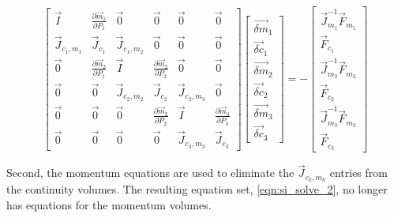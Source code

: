   \begin{equation}
 \label{eqn:si_solve_1}
 \begin{bmatrix} 
 \vec{I} & \frac{\partial \vec{m}_1}{\partial P_1} & \vec{0} & \vec{0} & \vec{0} & \vec{0}\\
 \vec{J}_{c_1,m_1} & \vec{J}_{c_1} & \vec{J}_{c_1,m_2} & \vec{0} & \vec{0} & \vec{0} \\
 \vec{0} & \frac{\partial \vec{m}_2}{\partial P_1} & \vec{I} & \frac{\partial \vec{m}_2}{\partial P_2} & \vec{0} & \vec{0} \\
 \vec{0} & \vec{0} & \vec{J}_{c_2,m_2} & \vec{J}_{c_2} & \vec{J}_{c_2,m_3} & \vec{0} \\
 \vec{0} & \vec{0} & \vec{0} & \frac{\partial \vec{m}_{3}}{\partial P_2} & \vec{I} & \frac{\partial \vec{m}_{3}}{\partial P_3} \\ 
 \vec{0} & \vec{0} & \vec{0} & \vec{0} & \vec{J}_{c_3,m_3} & \vec{J}_{c_3}  
 \end{bmatrix} \begin{bmatrix}
 \vec{\delta m}_{1} \\ \vec{\delta c}_{1} \\
 \vec{\delta m}_{2} \\ \vec{\delta c}_{2} \\
 \vec{\delta m}_{3} \\ \vec{\delta c}_{3}
\end{bmatrix}  = -\begin{bmatrix}
 \vec{J}^{-1}_{m_1}\vec{F}_{m_1} \\ \vec{F}_{c_1} \\
 \vec{J}^{-1}_{m_2}\vec{F}_{m_2} \\ \vec{F}_{c_2} \\
 \vec{J}^{-1}_{m_3}\vec{F}_{m_3} \\ \vec{F}_{c_3} \end{bmatrix}
 \end{equation}

Second, the momentum equations are used to eliminate the $\vec{J}_{c_k,m_k}$ entries from the continuity volumes.
The resulting equation set, \eqref{eqn:si_solve_2}, no longer has equations for the momentum volumes.

